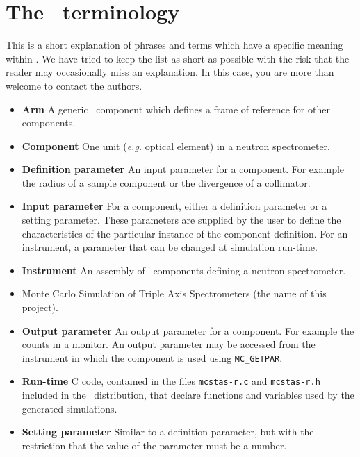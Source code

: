 
\chapter{The \MCS\ terminology}
\label{s:terminology}

This is a short explanation of phrases and terms which have a specific
meaning within \MCS. We have tried to keep the list as short
as possible with the risk that the reader may occasionally miss
an explanation. In this case, you are more than welcome to contact
the authors.

\noindent
\begin{itemize}
\item{\bf Arm}  A generic \MCS\ component which defines a frame of reference
      for other components. 
\item{\bf Component} One unit ({\em e.g.} optical element) in a neutron
      spectrometer.
\item{\bf Definition parameter} An input parameter for a component. For
  example the radius of a sample component or the divergence of a collimator.
\item{\bf Input parameter} For a component, either a definition parameter
or a setting parameter. These parameters are supplied by the user to
define the characteristics of the particular instance of the component
definition. For an instrument, a parameter that can be changed at
simulation run-time.
\item{\bf Instrument} An assembly of \MCS\ components defining
      a neutron spectrometer.
\item{\bf \MCS} Monte Carlo Simulation of Triple Axis Spectrometers
       (the name of this project).
\item{\bf Output parameter} An output parameter for a component.
  For example the counts in a monitor. An output parameter may be
  accessed from the instrument in which the component is used using
  \verb`MC_GETPAR`.
\item{\bf Run-time} C code, contained in the files
  \verb+mcstas-r.c+ and \verb+mcstas-r.h+ included in the \MCS\
  distribution, that declare functions and variables used by the
  generated simulations.
\item{\bf Setting parameter} Similar to a definition parameter, but with the
  restriction that the value of the parameter must be a number.
\end{itemize}
